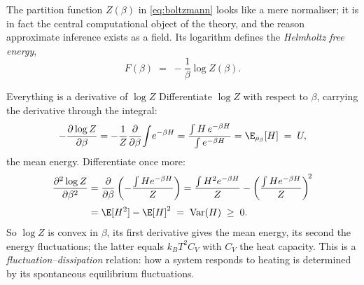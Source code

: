 The partition function $Z(\beta)$ in \eqref{eq:boltzmann} looks like a
mere normaliser; it is in fact the central computational object of the
theory, and the reason approximate inference exists as a field. Its
logarithm defines the \emph{Helmholtz free energy},
\begin{equation}
  F(\beta) \;=\; -\frac{1}{\beta} \log Z(\beta).
  \label{eq:free-energy}
\end{equation}

\begin{toolbox}{Everything is a derivative of $\log Z$}
Differentiate $\log Z$ with respect to $\beta$, carrying the derivative
through the integral:
\begin{equation*}
  -\frac{\partial \log Z}{\partial \beta}
  = -\frac{1}{Z}\frac{\partial}{\partial \beta}\!\int\! e^{-\beta H}
  = \frac{\int H\, e^{-\beta H}}{\int e^{-\beta H}}
  = \E_{\rho_\beta}[H] \;=\; U ,
\end{equation*}
the mean energy. Differentiate once more:
\begin{align*}
  \frac{\partial^2 \log Z}{\partial \beta^2}
  &= \frac{\partial}{\partial \beta}
     \left( -\frac{\int H e^{-\beta H}}{Z} \right)
   = \frac{\int H^2 e^{-\beta H}}{Z}
     - \left( \frac{\int H e^{-\beta H}}{Z} \right)^{\!2} \\[2pt]
  &= \E[H^2] - \E[H]^2 \;=\; \operatorname{Var}(H) \;\geq\; 0 .
\end{align*}
So $\log Z$ is convex in $\beta$, its first derivative gives the mean
energy, its second the energy fluctuations; the latter equals
$k_B T^2 C_V$ with $C_V$ the heat capacity. This is a
\emph{fluctuation--dissipation} relation: how a system responds to
heating is determined by its spontaneous equilibrium fluctuations.


\end{toolbox}
